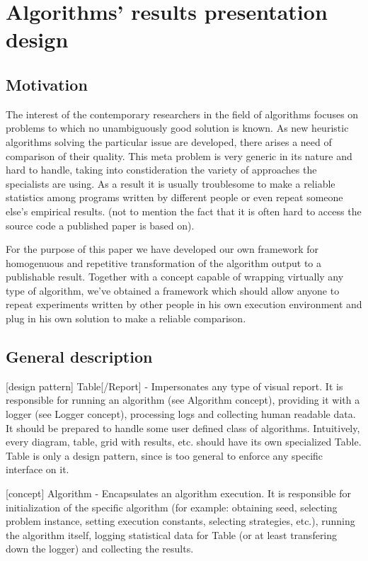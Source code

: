 \chapter{Algorithms' results presentation design}
\section{Motivation}

The interest of the contemporary researchers in the field of algorithms 
focuses on problems to which no unambiguously good solution is known. As new heuristic algorithms solving the
particular issue are developed, there arises a need of comparison of their
quality. This meta problem is very generic in its nature and hard to handle,
taking into constideration the variety of approaches the specialists are using.
As a result it is usually troublesome to make a reliable statistics among programs
written by different people or even repeat someone else's empirical results. (not to mention
the fact that it is often hard to access the source code a published paper is
based on).

For the purpose of this paper we have developed our own framework
for homogenuous and repetitive transformation of the algorithm output to a
publishable result. Together with a concept capable of wrapping virtually any
type of algorithm, we've obtained a framework which should allow anyone to
repeat experiments written by other people in his own execution environment
and plug in his own solution to make a reliable comparison.

\section{General description}

[design pattern] Table[/Report] - Impersonates any type of visual report.
	It is responsible for running an algorithm (see Algorithm concept), providing
	it with a logger (see Logger concept), processing logs and collecting human
	readable data. It should be prepared to handle some user defined class of
	algorithms. Intuitively, every diagram, table, grid with results, etc. should
	have its own specialized Table. Table is only a design pattern, since is too
	general to enforce any specific interface on it.

[concept] Algorithm - Encapsulates an algorithm execution. It is responsible for
	initialization of the specific algorithm (for example: obtaining seed, 
	selecting problem instance, setting execution constants, selecting strategies,
	etc.), running the algorithm itself, logging statistical data for Table
	(or at least transfering down the logger) and collecting the results.

